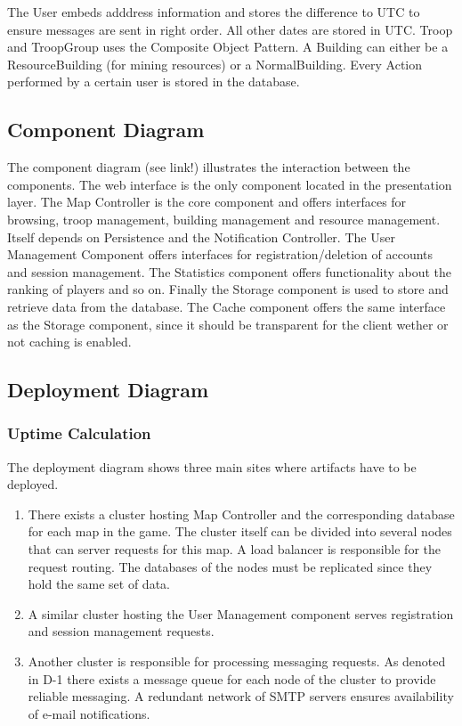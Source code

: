 \documentclass[11pt]{article}
\begin{document}
The User embeds adddress information and stores the difference to UTC to ensure messages are sent in right order. All other dates are stored in UTC. Troop and TroopGroup uses the Composite Object Pattern. A Building can either be a ResourceBuilding (for mining resources) or a NormalBuilding. Every Action performed by a certain user is stored in the database.

\subsection{Component Diagram}

The component diagram (see link!) illustrates the interaction between the components. The web  interface is the only component located in the presentation layer. The Map Controller is the core component and offers interfaces for browsing, troop management, building management and resource management. Itself depends on Persistence and the Notification Controller. The User Management Component offers interfaces for registration/deletion of accounts and session management. The Statistics component offers functionality about the ranking of players and so on. Finally the Storage component is used to store and retrieve data from the database. The Cache component offers the same interface as the Storage component, since it should be transparent for the client wether or not caching is enabled.

\subsection{Deployment Diagram}

\subsubsection{Uptime Calculation}

The deployment diagram shows three main sites where artifacts have to be deployed. 
\begin{enumerate}
\item There exists a cluster hosting Map Controller and the corresponding database for each map in the game. The cluster itself can be divided into several nodes that can server requests for this map. A load balancer is responsible for the request routing. The databases of the nodes must be replicated since they hold the same set of data.
\item A similar cluster hosting the User Management component serves registration and session management requests.
\item Another cluster is responsible for processing messaging requests. As denoted in D-1 there exists a message queue for each node of the cluster to provide reliable messaging. A redundant network of SMTP servers ensures availability of e-mail notifications.
\end{enumerate}
\end{document}
